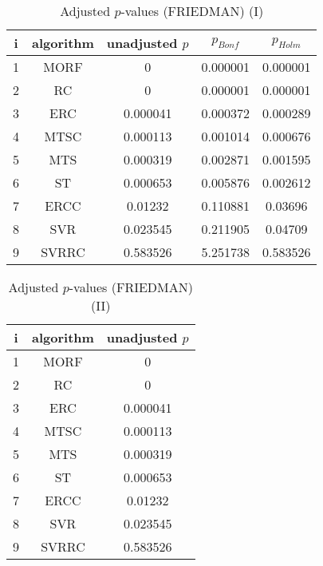 \documentclass[a4paper,10pt]{article}
\begin{document}
\begin{landscape}
\begin{table}[!htp]
\centering\small
\begin{tabular}{ccccc}
i&algorithm&unadjusted $p$&$p_{Bonf}$&$p_{Holm}$\\
\hline1&MORF&0&0.000001&0.000001\\2&RC&0&0.000001&0.000001\\3&ERC&0.000041&0.000372&0.000289\\4&MTSC&0.000113&0.001014&0.000676\\5&MTS&0.000319&0.002871&0.001595\\6&ST&0.000653&0.005876&0.002612\\7&ERCC&0.01232&0.110881&0.03696\\8&SVR&0.023545&0.211905&0.04709\\9&SVRRC&0.583526&5.251738&0.583526\\\hline
\end{tabular}
\caption{Adjusted $p$-values (FRIEDMAN) (I)}
\end{table}
\begin{table}[!htp]
\centering\small
\begin{tabular}{ccc}
i&algorithm&unadjusted $p$\\
\hline1&MORF&0\\2&RC&0\\3&ERC&0.000041\\4&MTSC&0.000113\\5&MTS&0.000319\\6&ST&0.000653\\7&ERCC&0.01232\\8&SVR&0.023545\\9&SVRRC&0.583526\\\hline
\end{tabular}
\caption{Adjusted $p$-values (FRIEDMAN) (II)}
\end{table}

\newpage
\end{landscape}
\end{document}
